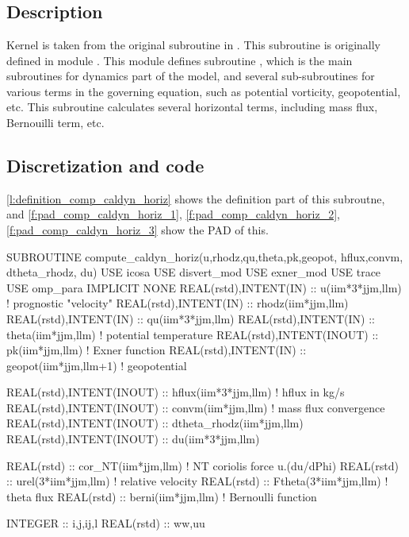 \section{}

\subsection{Description}

Kernel  is taken from the original subroutine
 in \DYNAMICO.
%
This subroutine is originally defined in module .
%
This module defines subroutine , which is the main
subroutines for dynamics part of the model, and several sub-subroutines
for various terms in the governing equation, such as potential
vorticity, geopotential, etc.
%
This subroutine calculates several horizontal terms, including mass
flux, Bernouilli term, etc.


\subsection{Discretization and code}

\autoref{l:definition_comp_caldyn_horiz} shows the definition part of this subroutne,
and \autoref{f:pad_comp_caldyn_horiz_1}, \ref{f:pad_comp_caldyn_horiz_2}, \ref{f:pad_comp_caldyn_horiz_3}
show the PAD of this.


\begin{LstF90}[%
caption={Definition part of \src{compute_caldyn_horiz}},%
label={l:definition_comp_caldyn_horiz}%
]
  SUBROUTINE compute_caldyn_horiz(u,rhodz,qu,theta,pk,geopot, hflux,convm, dtheta_rhodz, du)
  USE icosa
  USE disvert_mod
  USE exner_mod
  USE trace
  USE omp_para
  IMPLICIT NONE
    REAL(rstd),INTENT(IN)  :: u(iim*3*jjm,llm)    ! prognostic "velocity"
    REAL(rstd),INTENT(IN)  :: rhodz(iim*jjm,llm)
    REAL(rstd),INTENT(IN)  :: qu(iim*3*jjm,llm)
    REAL(rstd),INTENT(IN)  :: theta(iim*jjm,llm)  ! potential temperature
    REAL(rstd),INTENT(INOUT) :: pk(iim*jjm,llm) ! Exner function
    REAL(rstd),INTENT(IN)  :: geopot(iim*jjm,llm+1)    ! geopotential

    REAL(rstd),INTENT(INOUT) :: hflux(iim*3*jjm,llm) ! hflux in kg/s
    REAL(rstd),INTENT(INOUT) :: convm(iim*jjm,llm)  ! mass flux convergence
    REAL(rstd),INTENT(INOUT) :: dtheta_rhodz(iim*jjm,llm)
    REAL(rstd),INTENT(INOUT) :: du(iim*3*jjm,llm)

    REAL(rstd) :: cor_NT(iim*jjm,llm)  ! NT coriolis force u.(du/dPhi)
    REAL(rstd) :: urel(3*iim*jjm,llm)  ! relative velocity
    REAL(rstd) :: Ftheta(3*iim*jjm,llm) ! theta flux
    REAL(rstd) :: berni(iim*jjm,llm)  ! Bernoulli function

    INTEGER :: i,j,ij,l
    REAL(rstd) :: ww,uu
\end{LstF90}


